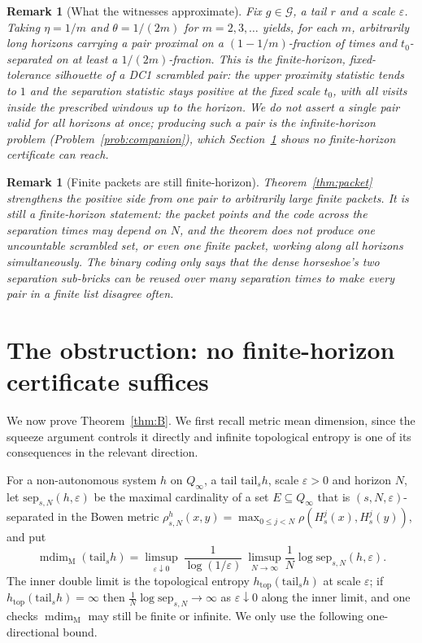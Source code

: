 \documentclass[11pt]{article}
\newtheorem{remark}[theorem]{Remark}
\newcommand{\Q}{Q_\infty}
\newcommand{\Gcal}{\mathcal{G}}
\newcommand{\mdim}{\operatorname{mdim}_{\mathrm M}}
\begin{document}
\begin{remark}[What the witnesses approximate]\label{rem:approx}
Fix $g\in\Gcal$, a tail $r$ and a scale $\varepsilon$.  Taking
\(\eta=1/m\) and \(\theta=1/(2m)\) for \(m=2,3,\dots\) yields, for each \(m\),
arbitrarily long horizons carrying a pair proximal on a \((1-1/m)\)-fraction of times
and \(t_0\)-separated on at least a \(1/(2m)\)-fraction.  This
is the finite-horizon, fixed-tolerance silhouette of a DC1 scrambled pair: the upper
proximity statistic tends to $1$ and the separation statistic stays positive at the
fixed scale $t_0$, with all visits inside the prescribed windows up to the horizon.  We
do not assert a single pair valid for all horizons at once; producing such a pair is the
infinite-horizon problem (Problem~\ref{prob:companion}), which Section~\ref{sec:obstruction}
shows no finite-horizon certificate can reach.
\end{remark}

\begin{remark}[Finite packets are still finite-horizon]\label{rem:packet-honest}
Theorem~\ref{thm:packet} strengthens the positive side from one pair to
arbitrarily large finite packets.  It is still a finite-horizon statement: the
packet points and the code across the separation times may depend on \(N\), and
the theorem does not produce one uncountable scrambled set, or even one finite
packet, working along all horizons simultaneously.  The binary coding only says
that the dense horseshoe's two separation sub-bricks can be reused over many
separation times to make every pair in a finite list disagree often.
\end{remark}

\section{The obstruction: no finite-horizon certificate suffices}\label{sec:obstruction}

We now prove Theorem~\ref{thm:B}.  We first recall metric mean dimension, since the
squeeze argument controls it directly and infinite topological entropy is one of its
consequences in the relevant direction.

For a non-autonomous system $h$ on $\Q$, a tail $\mathrm{tail}_sh$, scale
$\varepsilon>0$ and horizon $N$, let $\mathrm{sep}_{s,N}(h,\varepsilon)$ be the maximal
cardinality of a set $E\subseteq\Q$ that is $(s,N,\varepsilon)$-separated in the Bowen
metric $\rho^h_{s,N}(x,y)=\max_{0\le j<N}\rho(H^j_s(x),H^j_s(y))$, and put
\[
\mdim(\mathrm{tail}_sh)
=\limsup_{\varepsilon\downarrow0}\ \frac{1}{\log(1/\varepsilon)}\
\limsup_{N\to\infty}\frac1N\log\mathrm{sep}_{s,N}(h,\varepsilon).
\]
The inner double limit is the topological entropy $h_{\mathrm{top}}(\mathrm{tail}_sh)$
at scale $\varepsilon$; if $h_{\mathrm{top}}(\mathrm{tail}_sh)=\infty$ then
$\frac1N\log\mathrm{sep}_{s,N}\to\infty$ as $\varepsilon\downarrow0$ along the inner
limit, and one checks $\mdim$ may still be finite or infinite.  We only use the
following one-directional bound.
\end{document}
